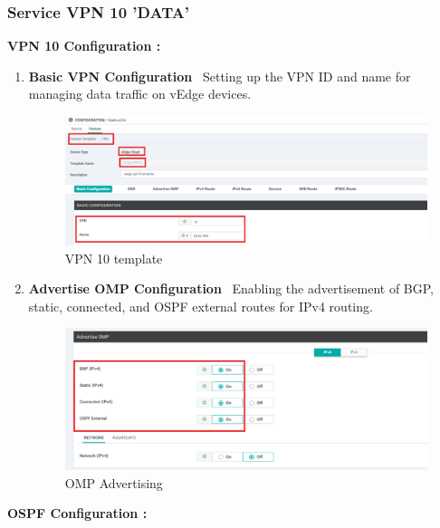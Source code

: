 \documentclass[12pt,english]{report}
\begin{document}
\subsubsection{Service VPN 10 'DATA'}
\textbf{VPN 10 Configuration :}
\begin{enumerate}
    \item \textbf{Basic VPN Configuration} \
    Setting up the VPN ID and name for managing data traffic on vEdge devices.
\begin{figure}[H]
    \centering
    \includegraphics[width= 1 \textwidth]{chapitre 3/template/10.png}
    \caption{VPN 10 template}
    \label{VPN 10 template}
\end{figure}
    \item \textbf{Advertise OMP Configuration} \
    Enabling the advertisement of BGP, static, connected, and OSPF external routes for IPv4 routing.
\begin{figure}[H]
    \centering
    \includegraphics[width= 1 \textwidth]{chapitre 3/template/10.5.png}
    \caption{OMP Advertising}
    \label{OMP Advertising}
\end{figure}
\end{enumerate}
\textbf{OSPF Configuration :}
\end{document}
